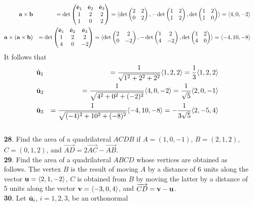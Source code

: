 \documentclass[12pt]{amsbook}
\newcommand{\la}{\langle}
\newcommand{\ra}{\rangle}
\begin{document}
\begin{eqnarray*}
{\bf a}\times{\bf b}&&=\det
\begin{pmatrix}
\hat{\bf e}_1 & \hat{\bf e}_2 & \hat{\bf e}_3\cr 1&2&2\cr 1&0&2 \end{pmatrix}=\la \det\begin{pmatrix}2&2\cr 0&2  \end{pmatrix}, -\det\begin{pmatrix}1&2\cr 1&2  \end{pmatrix}, \det\begin{pmatrix}1&2\cr 1&0 \end{pmatrix} \ra =\la 4,0,-2 \ra \\
{\bf a}\times({\bf a}\times{\bf b})&&=\det
\begin{pmatrix}
\hat{\bf e}_1 & \hat{\bf e}_2 & \hat{\bf e}_3\cr 1&2&2\cr 4&0&-2 \end{pmatrix}=\la \det\begin{pmatrix}2&2\cr 0&-2  \end{pmatrix}, -\det\begin{pmatrix}1&2\cr 4&-2  \end{pmatrix}, \det\begin{pmatrix}1&2\cr 4&0 \end{pmatrix} \ra =\la -4,10,-8 \ra
\end{eqnarray*}
It follows that
\begin{eqnarray*}
\hat{\bf u}_1&&=\frac{1}{\sqrt{1^2+2^2+2^2}}\la 1,2,2 \ra = \frac{1}{3}\la 1,2,2 \ra\\
\hat{\bf u}_2&&=\frac{1}{\sqrt{4^2+0^2+(-2)^2}}\la 4,0,-2 \ra = \frac{1}{\sqrt{5}}\la 2,0,-1 \ra\\
\hat{\bf u}_3&&=\frac{1}{\sqrt{(-4)^2+10^2+(-8)^2}}\la -4,10,-8 \ra=-\frac{1}{3\sqrt{5}}\la 2,-5,4 \ra
\end{eqnarray*}
\\
{\small\bf 28}. Find the area of a quadrilateral $ACDB$ if 
$A=(1,0,-1)$, $B=(2,1,2)$, $C=(0,1,2)$, and $\overrightarrow{AD}=
2\overrightarrow{AC}-\overrightarrow{AB}$.
\\
{\small\bf 29}. Find the area of a quadrilateral $ABCD$ whose vertices 
are obtained as follows. The vertex $B$ is the result of moving 
$A$ by a distance of 6 units along the vector ${\bf u}=\la 2,1,-2\ra$,
$C$ is obtained from $B$ by moving the latter by a distance of 5 units 
along the vector ${\bf v}=\la -3,0,4\ra$, and $\overrightarrow{CD}=
{\bf v}-{\bf u}$. \\ 
{\small\bf 30}.
Let $\hat{\bf u}_i$, $i=1,2,3$, be an orthonormal 
\end{document}
